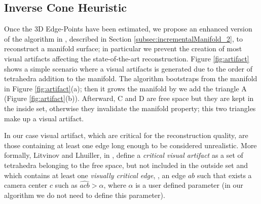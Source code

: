
\subsection{Inverse Cone Heuristic}
\label{sec:visualartifacts}
Once the 3D Edge-Points have been estimated, we propose an enhanced version of the algorithm in \cite{litvinov_lhuillier_13}, described in Section \ref{subsec:incrementalManifold_2}, to reconstruct a manifold surface; in particular we prevent the creation of most visual artifacts affecting the state-of-the-art reconstruction.
Figure \ref{fig:artifact} shows a simple scenario where a visual artifacts is generated due to the order of tetrahedra addition to the manifold.
The algorithm bootstraps from the manifold in Figure \ref{fig:artifact}(a); then it grows the manifold by we add the triangle A (Figure \ref{fig:artifact}(b)). Afterward, C and D are free space but they are kept in the inside set, otherwise they invalidate the manifold property; this two triangles make up a visual artifact.

In our case visual artifact, which are critical for the reconstruction quality, are those containing at least one edge long enough to be considered unrealistic. 
More formally, Litvinov and Lhuiller, in \cite{litvinov_Lhiuller14}, define a \emph{critical visual artifact} as a set of tetrahedra belonging to the free space, but not included in the outside set and which contains at least one \emph{visually critical edge}, \ie, an edge $ab$ such that exists a camera center $c$ such as $\widehat{acb}>\alpha$, where $\alpha$ is a user defined parameter (in our algorithm we do not need to define this parameter).


